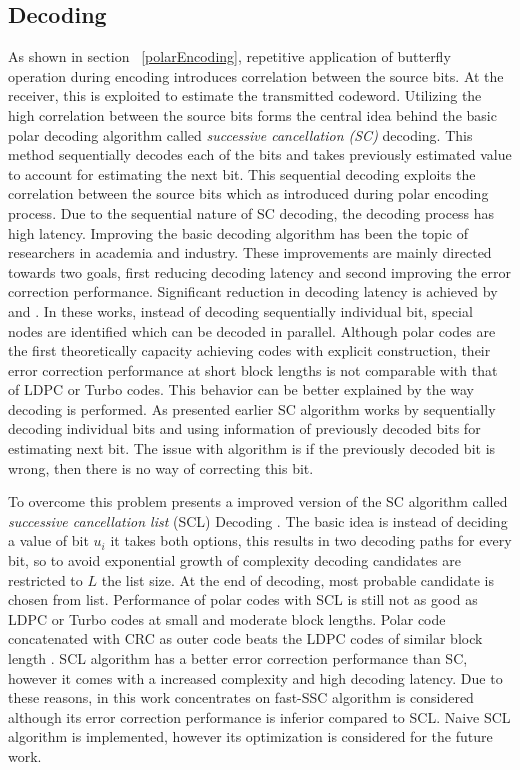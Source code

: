 \subsection{Decoding}
As shown in section ~\ref{polarEncoding}, repetitive application of butterfly operation during encoding introduces correlation between the source bits. At the receiver, this is exploited to estimate the transmitted codeword. Utilizing the high correlation between the source bits forms the central idea behind the basic polar decoding algorithm called \emph{successive cancellation (SC)} decoding. This method sequentially decodes each of the bits and takes previously estimated value to account for estimating the next bit. This sequential decoding exploits the correlation between the source bits which as introduced during polar encoding process. Due to the sequential nature of SC decoding, the decoding process has high latency. Improving the basic decoding algorithm has been the topic of researchers in academia and industry. These improvements are mainly directed towards two goals, first reducing decoding latency and second improving the error correction performance. Significant reduction in decoding latency is achieved by \cite{SSC} and \cite{fastSSC}. In these works, instead of decoding sequentially individual bit, special nodes are identified which can be decoded in parallel. Although polar codes are the first theoretically capacity achieving codes with explicit construction, their error correction performance at short block lengths is not comparable with that of LDPC or Turbo codes. This behavior can be better explained by the way decoding is performed. As presented earlier SC algorithm works by sequentially decoding individual bits and using information of previously decoded bits for estimating next bit. The issue with algorithm is if the previously decoded bit is wrong, then there is no way of correcting this bit.

To overcome this problem \cite{SCL} presents a improved version of the SC algorithm called \emph{successive cancellation list} (SCL) Decoding . The basic idea is instead of deciding a value of bit $u_{i}$ it takes both options, this results in two decoding paths for every bit, so to avoid exponential growth of complexity decoding candidates are restricted to $L$ the list size. At the end of decoding, most probable candidate is chosen from list. Performance of polar codes with SCL is still not as good as LDPC or Turbo codes at small and moderate block lengths. Polar code concatenated with CRC as outer code beats the LDPC codes of similar block length \cite{SCL}. SCL algorithm has a better error correction performance than SC, however it comes with a increased complexity and high decoding latency. Due to these reasons, in this work concentrates on fast-SSC algorithm is considered although its error correction performance is inferior compared to SCL. Naive SCL algorithm is implemented, however its optimization is considered for the future work.

